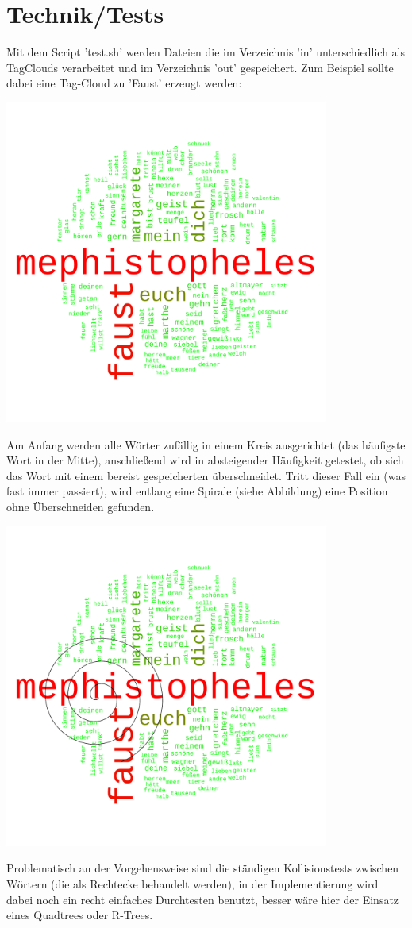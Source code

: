\section{Technik/Tests}
Mit dem Script 'test.sh' werden Dateien die im Verzeichnis 'in' unterschiedlich als TagClouds verarbeitet und 
im Verzeichnis 'out' gespeichert.
Zum Beispiel sollte dabei eine Tag-Cloud zu 'Faust' erzeugt werden:
\begin{center}
    \includegraphics[width=0.8\textwidth]{images/faust.pdf}    
\end{center}
Am Anfang werden alle Wörter zufällig in einem Kreis ausgerichtet (das häufigste Wort in der Mitte),
anschließend wird in absteigender Häufigkeit getestet, ob sich das Wort mit einem bereist gespeicherten überschneidet.
Tritt dieser Fall ein (was fast immer passiert), wird entlang eine Spirale (siehe Abbildung) eine Position ohne Überschneiden gefunden.
\begin{center}
    \includegraphics[width=0.8\textwidth]{images/faust2.pdf}    
\end{center}
Problematisch an der Vorgehensweise sind die ständigen Kollisionstests zwischen Wörtern (die als Rechtecke behandelt werden),
in der Implementierung wird dabei noch ein recht einfaches Durchtesten benutzt, besser wäre hier der Einsatz eines 
Quadtrees oder R-Trees.

